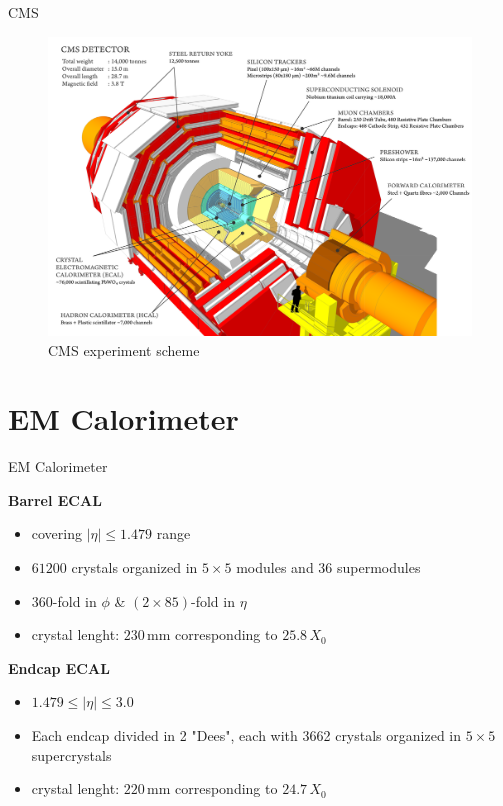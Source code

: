 \documentclass[10pt]{beamer}
\begin{document}
\begin{frame}[fragile]{CMS}
  \begin{figure}
        \centering
        \includegraphics[width=.8\textwidth]{./img/CMS_scheme.png}
        \caption{CMS experiment scheme}
        \label{fig:cms_scheme}
    \end{figure}
\end{frame}


\section{EM Calorimeter}

\begin{frame}[fragile]{EM Calorimeter}



    \textbf{Barrel ECAL}
    \begin{itemize}
        \item  covering $|\eta| \leq 1.479 $ range
        \item $61200$ crystals organized in $5\times5$ modules and $36$ supermodules
        \item $360$-fold in $\phi$ & $(2\times85)$-fold in $\eta$
        \item crystal lenght: $230$\,mm corresponding to $25.8\,X_0$ 
    \end{itemize}
    \textbf{Endcap ECAL} 
    \begin{itemize}
        \item $1.479 \leq |\eta| \leq 3.0 $
        \item Each endcap divided in 2 "Dees", each with 3662 crystals organized in $5\times5$ supercrystals
        \item crystal lenght: $220$\,mm corresponding to $24.7\,X_0$ 
    \end{itemize}
\end{frame}
\end{document}
